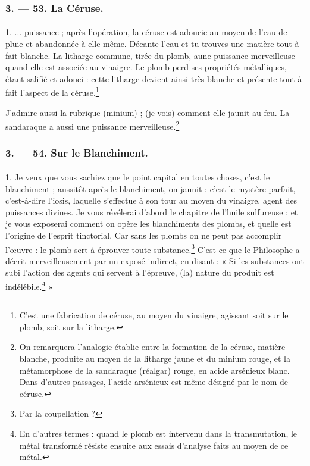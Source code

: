 \documentclass[a4paper, 11pt, oneside, polutonikogreek, french]{article}
\begin{document}
\bigskip
\centerline{\EightStarTaper}
\centerline{\EightStarTaper\EightStarTaper}
\bigskip

\subsubsection{3. --- 53. La Céruse.}
\paragraph{}
1. ... puissance ; après l'opération, la céruse est adoucie au moyen de l'eau de pluie et abandonnée à elle-même. Décante l'eau et tu trouves une matière tout à fait blanche. La litharge commune, tirée du plomb, aune puissance merveilleuse quand elle est associée au vinaigre. Le plomb perd ses propriétés métalliques, étant salifié et adouci : cette litharge devient ainsi très blanche et présente tout à fait l'aspect de la céruse.\footnote{C'est une fabrication de céruse, au moyen du vinaigre, agissant soit sur le plomb, soit sur la litharge.}

J'admire aussi la rubrique (minium) ; (je vois) comment elle jaunit au feu. La sandaraque a aussi une puissance merveilleuse.\footnote{On remarquera l'analogie établie entre la formation de la céruse, matière blanche, produite au moyen de la litharge jaune et du minium rouge, et la métamorphose de la sandaraque (réalgar) rouge, en acide arsénieux blanc. Dans d'autres passages, l'acide arsénieux est même désigné par le nom de céruse.}

\bigskip
\centerline{\EightStarTaper}
\centerline{\EightStarTaper\EightStarTaper}
\bigskip

\subsubsection{3. --- 54. Sur le Blanchiment.}
\paragraph{}
1. Je veux que vous sachiez que le point capital en toutes choses, c'est le blanchiment ; aussitôt après le blanchiment, on jaunit : c'est le mystère parfait, c'est-à-dire l'iosis, laquelle s'effectue à son tour au moyen du vinaigre, agent des puissances divines. Je vous révélerai d'abord le chapitre de l'huile sulfureuse ; et je vous exposerai comment on opère les blanchiments des plombs, et quelle est l'origine de l'esprit tinctorial. Car sans les plombs on ne peut pas accomplir l'œuvre : le plomb sert à éprouver toute substance.\footnote{Par la coupellation ?} C'est ce que le Philosophe a décrit merveilleusement par un exposé indirect, en disant : « Si les substances ont subi l'action des agents qui servent à l'épreuve, (la) nature du produit est indélébile.\footnote{En d'autres termes : quand le plomb est intervenu dans la transmutation, le métal transformé résiste ensuite aux essais d'analyse faits au moyen de ce métal.} »
\end{document}
